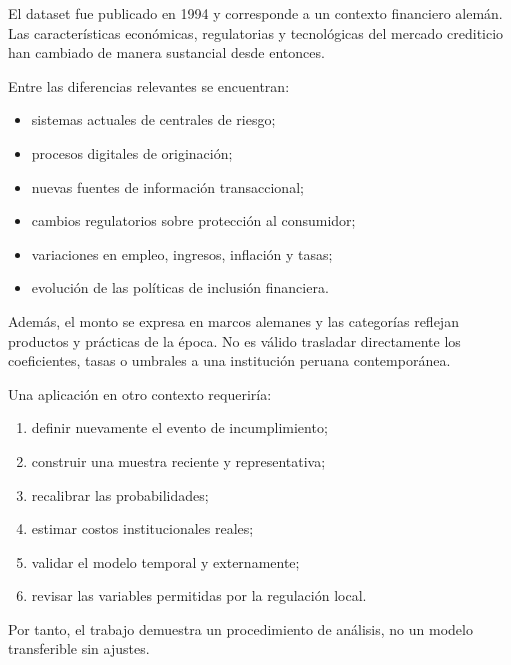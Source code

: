 El dataset fue publicado en 1994 y corresponde a un contexto financiero
alemán. Las características económicas, regulatorias y tecnológicas del
mercado crediticio han cambiado de manera sustancial desde entonces.

Entre las diferencias relevantes se encuentran:

\begin{itemize}
    \item sistemas actuales de centrales de riesgo;

    \item procesos digitales de originación;

    \item nuevas fuentes de información transaccional;

    \item cambios regulatorios sobre protección al consumidor;

    \item variaciones en empleo, ingresos, inflación y tasas;

    \item evolución de las políticas de inclusión financiera.
\end{itemize}

Además, el monto se expresa en marcos alemanes y las categorías reflejan
productos y prácticas de la época. No es válido trasladar directamente
los coeficientes, tasas o umbrales a una institución peruana
contemporánea.

Una aplicación en otro contexto requeriría:

\begin{enumerate}
    \item definir nuevamente el evento de incumplimiento;

    \item construir una muestra reciente y representativa;

    \item recalibrar las probabilidades;

    \item estimar costos institucionales reales;

    \item validar el modelo temporal y externamente;

    \item revisar las variables permitidas por la regulación local.
\end{enumerate}

Por tanto, el trabajo demuestra un procedimiento de análisis, no un
modelo transferible sin ajustes.

